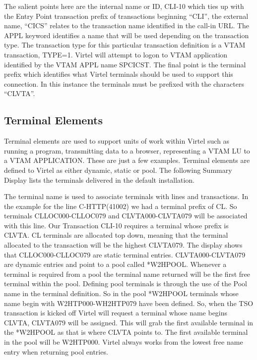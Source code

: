 \documentclass[letterpaper,10pt,english]{sphinxmanual}
\begin{document}
The salient points here are the internal name or ID, CLI-10 which ties up with the Entry Point transaction prefix of transactions beginning “CLI”, the external name, “CICS” relates to the transaction name identified in the call-in URL. The APPL keyword identifies a name that will be used depending on the transaction type. The transaction type for this particular transaction definition is a VTAM transaction, TYPE=1. Virtel will attempt to logon to VTAM application identified by the VTAM APPL name SPCICST. The final point is the terminal prefix which identifies what Virtel terminals should be used to support this connection. In this instance the terminals must be prefixed with the characters “CLVTA”.


\subsection{Terminal Elements}
\label{\detokenize{connectivity_guide:terminal-elements}}
Terminal elements are used to support units of work within Virtel such as running a program, transmitting data to a browser, representing a VTAM LU to a VTAM APPLICATION. These are just a few examples. Terminal elements are defined to Virtel as either dynamic, static or pool. The following Summary Display lists the terminals delivered in the default installation.


The terminal name is used to associate terminals with lines and transactions. In the example for the line C-HTTP(41002) we had a terminal prefix of CL. So terminals CLLOC000-CLLOC079 and CLVTA000-CLVTA079 will be associated with this line. Our Transaction CLI-10 requires a terminal whose prefix is CLVTA. CL terminals are allocated top down, meaning that the terminal allocated to the transaction will be the highest CLVTA079. The display shows that CLLOC000-CLLOC079 are static terminal entries. CLVTA000-CLVTA079 are dynamic entries and point to a pool called *W2HPOOL. Whenever a terminal is required from a pool the terminal name returned will be the first free terminal within the pool. Defining pool terminals is through the use of the Pool name in the terminal definition. So in the pool *W2HPOOL terminals whose name begin with W2HTP000-WH2HTP079 have been defined. So, when the TSO transaction is kicked off Virtel will request a terminal whose name begins CLVTA, CLVTA079 will be assigned. This will grab the first available terminal in the *W2HPOOL as that is where CLVTA points to. The first available terminal in the pool will be W2HTP000. Virtel always works from the lowest free name entry when returning pool entries.
\end{document}
